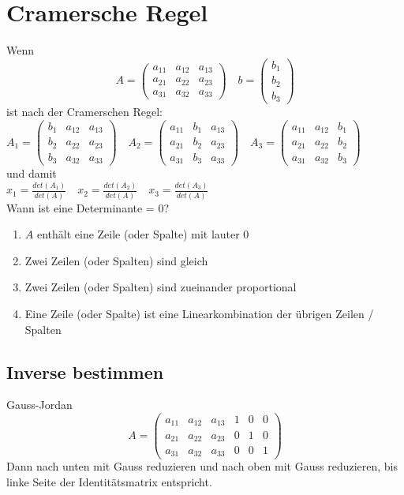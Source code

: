\documentclass{report}
\begin{document}
\section{Cramersche Regel}
Wenn
\begin{equation}A=\left(\begin{matrix}a_{11} & a_{12} & a_{13}\\a_{21} & a_{22} & a_{23}\\a_{31} & a_{32} & a_{33}\end{matrix}\right) \quad b = \left(\begin{matrix}b_1\\b_2\\b_3\end{matrix}\right)\end{equation}
ist nach der Cramerschen Regel:\\
$A_1=\left(\begin{matrix}b_1 & a_{12} & a_{13}\\b_2 & a_{22} & a_{23}\\b_3 & a_{32} & a_{33}\end{matrix}\right) \quad A_2=\left(\begin{matrix}a_{11} & b_1 & a_{13}\\a_{21} & b_2 & a_{23}\\a_{31} & b_3 & a_{33}\end{matrix}\right) \quad A_3=\left(\begin{matrix}a_{11} & a_{12} & b_1\\a_{21} & a_{22} & b_2\\a_{31} & a_{32} & b_3\end{matrix}\right)$\\
und damit\\
$x_1 = \frac{det(A_1)}{det(A)} \quad x_2 = \frac{det(A_2)}{det(A)} \quad x_3 = \frac{det(A_3)}{det(A)}$\\
Wann ist eine Determinante = 0?
\begin{enumerate}
\item $A$ enthält eine Zeile (oder Spalte) mit lauter 0
\item Zwei Zeilen (oder Spalten) sind gleich
\item Zwei Zeilen (oder Spalten) sind zueinander proportional
\item Eine Zeile (oder Spalte) ist eine Linearkombination der übrigen Zeilen / Spalten\end{enumerate}
\subsection{Inverse bestimmen}
Gauss-Jordan
\begin{equation}A=\left(\begin{matrix}a_{11} & a_{12} & a_{13} & 1 & 0 & 0\\a_{21} & a_{22} & a_{23} & 0 & 1 & 0\\a_{31} & a_{32} & a_{33} & 0 & 0 & 1\end{matrix}\right)\end{equation}
Dann nach unten mit Gauss reduzieren und nach oben mit Gauss reduzieren, bis linke Seite der Identitätsmatrix entspricht.
\end{document}

